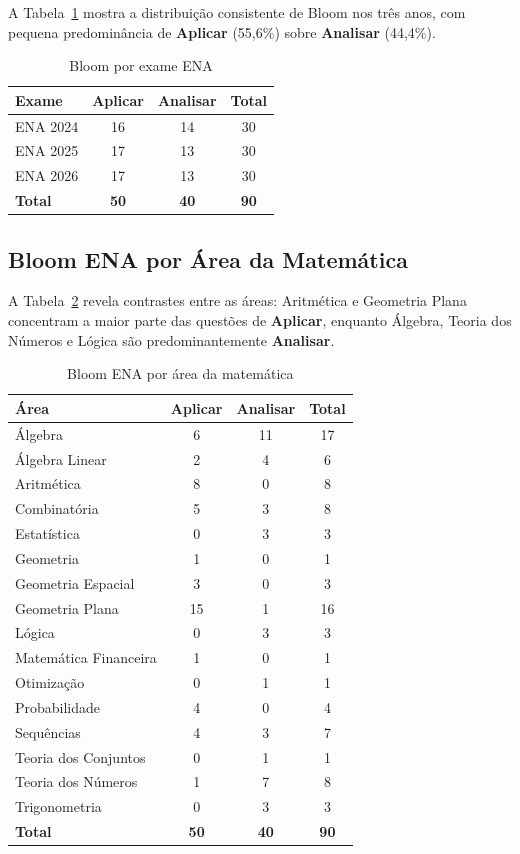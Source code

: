 \documentclass[12pt,a4paper]{article}
\newcommand{\bloom}[1]{\textcolor{verdeexame}{\textbf{#1}}}
\begin{document}
A Tabela~\ref{tab:bloom_ena_exame} mostra a distribuição consistente de
Bloom nos três anos, com pequena predominância de \bloom{Aplicar} (55,6\%)
sobre \bloom{Analisar} (44,4\%).

\begin{table}[H]
\centering
\caption{Bloom por exame ENA}
\label{tab:bloom_ena_exame}
\begin{tabular}{lccc}
\toprule
\textbf{Exame} & \textbf{Aplicar} & \textbf{Analisar} & \textbf{Total} \\
\midrule
ENA 2024 & 16 & 14 & 30 \\
ENA 2025 & 17 & 13 & 30 \\
ENA 2026 & 17 & 13 & 30 \\
\midrule
\textbf{Total} & \textbf{50} & \textbf{40} & \textbf{90} \\
\bottomrule
\end{tabular}
\end{table}

\subsection{Bloom ENA por Área da Matemática}

A Tabela~\ref{tab:bloom_ena_area} revela contrastes entre as áreas:
Aritmética e Geometria Plana concentram a maior parte das questões de
\bloom{Aplicar}, enquanto Álgebra, Teoria dos Números e Lógica são
predominantemente \bloom{Analisar}.

\begin{table}[H]
\centering
\caption{Bloom ENA por área da matemática}
\label{tab:bloom_ena_area}
\begin{tabular}{lccc}
\toprule
\textbf{Área} & \textbf{Aplicar} & \textbf{Analisar} & \textbf{Total} \\
\midrule
Álgebra & 6 & 11 & 17 \\
Álgebra Linear & 2 & 4 & 6 \\
Aritmética & 8 & 0 & 8 \\
Combinatória & 5 & 3 & 8 \\
Estatística & 0 & 3 & 3 \\
Geometria & 1 & 0 & 1 \\
Geometria Espacial & 3 & 0 & 3 \\
Geometria Plana & 15 & 1 & 16 \\
Lógica & 0 & 3 & 3 \\
Matemática Financeira & 1 & 0 & 1 \\
Otimização & 0 & 1 & 1 \\
Probabilidade & 4 & 0 & 4 \\
Sequências & 4 & 3 & 7 \\
Teoria dos Conjuntos & 0 & 1 & 1 \\
Teoria dos Números & 1 & 7 & 8 \\
Trigonometria & 0 & 3 & 3 \\
\midrule
\textbf{Total} & \textbf{50} & \textbf{40} & \textbf{90} \\
\bottomrule
\end{tabular}
\end{table}
\end{document}
